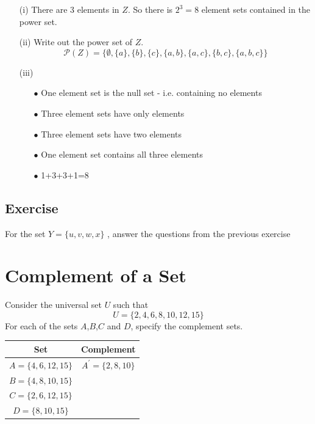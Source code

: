 \documentclass[]{report}
\begin{document}
\begin{itemize}


\item[(i)] There are 3 elements in $Z$. So there is $2^3 = 8$ element sets contained in the power set.

\item[(ii)] Write out the power set of $Z$.
\[ \mathcal{P}(Z) = \{ \emptyset, \{a\}, \{b\}, \{c\}, \{a,b\}, \{a,c\}, \{b,c\}, \{a,b,c\} \} \]

\item[(iii)]
\begin{itemize}
\item[$\bullet$] One element set is the null set - i.e. containing no
elements \item[$\bullet$] Three element sets have only elements \item[$\bullet$]
Three element sets have two elements \item[$\bullet$] One element set
contains all three elements \item[$\bullet$] 1+3+3+1=8
\end{itemize}
\end{itemize}
\subsection*{Exercise}
For the set $Y = \{u,v,w,x\}$ , answer the questions from the
previous exercise



\section*{Complement of a Set}
Consider the universal set $U$ such that
\[U=\{2,4,6,8,10,12,15\} \]
For each of the sets $A$,$B$,$C$ and $D$, specify the complement sets.
{

\begin{center}
\begin{tabular}{|c|c|}
\hline
Set &\phantom{sp} Complement \phantom{sp}\\
\hline \phantom{sp} $A=\{4,6,12,15\}$ \phantom{sp} &
$A^{\prime}=\{2,8,10\}$ \\ \hline $B=\{4,8,10,15\}$ & \\ \hline
$C=\{2,6,12,15\}$ & \\ \hline $D=\{8,10,15\}$ & \\ \hline

\end{tabular}
\end{center}
}
\end{document}
